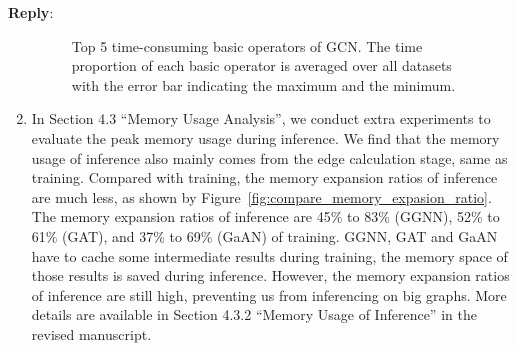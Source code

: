 \documentclass[12pt]{article}
\newenvironment{reply}
   {\medskip \noindent \textbf{Reply}:\  }
   {\medskip}
\begin{document}
\begin{reply}
\begin{enumerate}
    \begin{figure}[h]
        \centering
        \caption{Top 5 time-consuming basic operators of GCN. The time proportion of each basic operator is averaged over all datasets with the error bar indicating the maximum and the minimum.}
        \label{fig:compare_top_basic_operators}
    \end{figure}
    
    \item In Section 4.3 ``Memory Usage Analysis'', we conduct extra experiments to evaluate the peak memory usage during inference.
    We find that the memory usage of inference also mainly comes from the edge calculation stage, same as training.
    Compared with training, the memory expansion ratios of inference are much less, as shown by Figure~\ref{fig:compare_memory_expasion_ratio}.
    The memory expansion ratios of inference are 45\% to 83\% (GGNN), 52\% to 61\% (GAT), and 37\% to 69\% (GaAN) of training.
    GGNN, GAT and GaAN have to cache some intermediate results during training, the memory space of those results is saved during inference.
    However, the memory expansion ratios of inference are still high, preventing us from inferencing on big graphs.
    More details are available in Section 4.3.2 ``Memory Usage of Inference'' in the revised manuscript.
    

\end{enumerate}
\end{reply}
\end{document}
